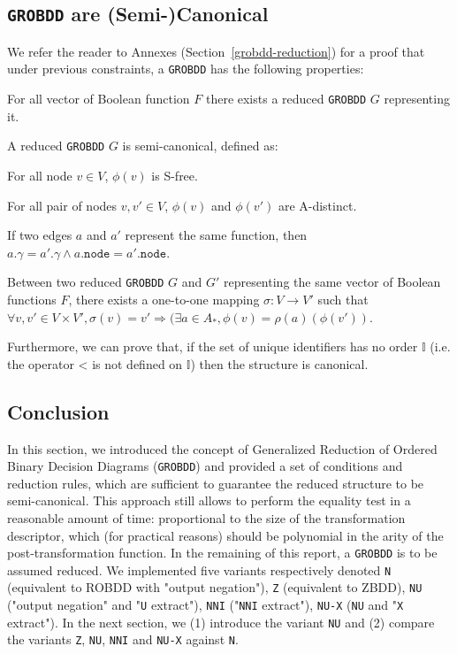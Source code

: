 \documentclass[a4paper,10pt]{article}
\newcommand{\I}{\mathbb{I}}
\newcommand{\uextract}{"\texttt{U} extract"}
\newcommand{\nniextract}{"\texttt{NNI} extract"}
\newcommand{\xextract}{"\texttt{X} extract"}
\newcommand{\GroBdd}{\texttt{GROBDD}}
\newcommand{\fieldNode}{\texttt{node}}
\newcommand{\fieldGamma}{\mathtt{\gamma}}
\begin{document}
\subsection{\GroBdd{} are (Semi-)Canonical}
We refer the reader to Annexes (Section~\ref{grobdd-reduction}) for a proof that under previous constraints, a \GroBdd{} has the following properties: \begin{compactenum}
\item For all vector of Boolean function $F$ there exists a reduced \GroBdd{} $G$ representing it.
\item A reduced \GroBdd{} $G$ is semi-canonical, defined as: \begin{compactenum}
\item For all node $v\in V$, $\phi(v)$ is S-free.
\item For all pair of nodes $v, v'\in V$, $\phi(v)$ and $\phi(v')$ are A-distinct.
\item If two edges $a$ and $a'$ represent the same function, then $a.\fieldGamma{} = a'.\fieldGamma{} \land a.\fieldNode{} = a'.\fieldNode{}$.
\end{compactenum}
\item Between two reduced \GroBdd{} $G$ and $G'$ representing the same vector of Boolean functions $F$, there exists a one-to-one mapping $\sigma: V \longrightarrow V'$ such that $\forall v, v' \in V \times V', \sigma(v) = v' \Rightarrow (\exists a \in A_{*}, \phi(v) = \rho(a)(\phi(v'))$.
\end{compactenum}
Furthermore, we can prove that, if the set of unique identifiers has no order $\I$ (i.e. the operator < is not defined on $\I$) then the structure is canonical.

\subsection{Conclusion}

In this section, we introduced the concept of Generalized Reduction of Ordered Binary Decision Diagrams (\GroBdd{}) and provided a set of conditions and reduction rules, which are sufficient to guarantee the reduced structure to be semi-canonical.
This approach still allows to perform the equality test in a reasonable amount of time: proportional to the size of the transformation descriptor, which (for practical reasons) should be polynomial in the arity of the post-transformation function.
In the remaining of this report, a \GroBdd{} is to be assumed reduced.
We implemented five variants respectively denoted \texttt{N} (equivalent to ROBDD with "output negation"), \texttt{Z} (equivalent to ZBDD), \texttt{NU} ("output negation" and \uextract{}), \texttt{NNI} (\nniextract), \texttt{NU-X} (\texttt{NU} and \xextract{}).
In the next section, we (1) introduce the variant \texttt{NU} and (2) compare the variants \texttt{Z}, \texttt{NU}, \texttt{NNI} and \texttt{NU-X} against \texttt{N}.
\end{document}

